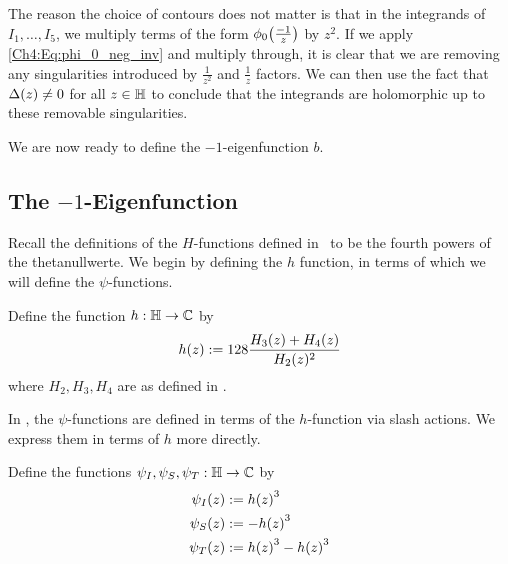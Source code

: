 The reason the choice of contours does not matter is that in the integrands of $I_1, \ldots, I_5$, we multiply terms of the form $\phi_0\!\left( \frac{-1}{z} \right)$ by $z^2$. If we apply \eqref{Ch4:Eq:phi_0_neg_inv} and multiply through, it is clear that we are removing any singularities introduced by $\frac{1}{z^2}$ and $\frac{1}{z}$ factors. We can then use the fact that $\Delta\!\left( z \right) \neq 0$ for all $z \in \mathbb{H}$ to conclude that the integrands are holomorphic up to these removable singularities.


We are now ready to define the $-1$-eigenfunction $b$.

\subsection{The $-1$-Eigenfunction}

Recall the definitions of the $H$-functions defined in \sorry\ to be the fourth powers of the thetanullwerte. We begin by defining the $h$ function, in terms of which we will define the $\psi$-functions.

\begin{boxdefinition}\label{Ch4:Def:h}
    Define the function $h : \mathbb{H} \to \mathbb{C}$ by
    \begin{align}
        h\!\left( z \right) := 128 \frac{H_3(z) + H_4(z)}{H_2(z)^2} \label{Ch4:Eq:h_def}
    \end{align}
    where $H_2, H_3, H_4$ are as defined in \sorry.
\end{boxdefinition}

In \cite{Viazovska8}, the $\psi$-functions are defined in terms of the $h$-function via slash actions. We express them in terms of $h$ more directly.

\begin{boxdefinition}\label{Ch4:Def:psi}
    Define the functions $\psi_I, \psi_S, \psi_T : \mathbb{H} \to \mathbb{C}$ by
    \begin{align}
        \psi_I\!\left( z \right) &:= h\!\left( z \right)^3
            \label{Ch4:Eq:psi_I_def} \\
        \psi_S\!\left( z \right) &:= -h\!\left( z \right)^3
            \label{Ch4:Eq:psi_S_def} \\
        \psi_T\!\left( z \right) &:= h\!\left( z \right)^3 - h\!\left( z \right)^3
            \label{Ch4:Eq:psi_T_def}
    \end{align}
    
\end{boxdefinition}

